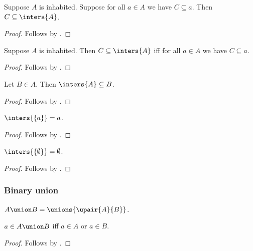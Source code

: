 \begin{proposition}\label{inters_greatest}
    Suppose $A$ is inhabited.
    Suppose for all $a\in A$ we have $C\subseteq a$.
    Then $C\subseteq\inters{A}$.
\end{proposition}
\begin{proof}
    Follows by .
\end{proof}

\begin{proposition}\label{subseteq_inters_iff}
    Suppose $A$ is inhabited.
    Then $C\subseteq\inters{A}$ iff for all $a\in A$ we have $C\subseteq a$.
\end{proposition}
\begin{proof}
    Follows by .
\end{proof}

\begin{proposition}\label{inters_subseteq_elem}
    Let $B\in A$.
    Then $\inters{A}\subseteq B$.
\end{proposition}
\begin{proof}
    Follows by .
\end{proof}

\begin{proposition}\label{inters_singleton}
    $\inters{\{a\}} = a$.
\end{proposition}
\begin{proof}
    Follows by .
\end{proof}

\begin{proposition}\label{inters_emptyset}
    $\inters{\{\emptyset\}} = \emptyset$.
\end{proposition}
\begin{proof}
    Follows by .
\end{proof}

\subsubsection{Binary union}

\begin{definition}\label{union}
    $A\union B = \unions{\upair{A}{B}}$.
\end{definition}

\begin{proposition}\label{union_iff}
    $a\in A\union B$ iff $a\in A$ or $a\in B$.
\end{proposition}
\begin{proof}
    Follows by .
\end{proof}

